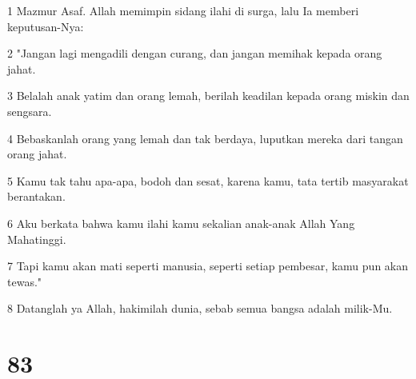 \par 1 Mazmur Asaf. Allah memimpin sidang ilahi di surga, lalu Ia memberi keputusan-Nya:
\par 2 "Jangan lagi mengadili dengan curang, dan jangan memihak kepada orang jahat.
\par 3 Belalah anak yatim dan orang lemah, berilah keadilan kepada orang miskin dan sengsara.
\par 4 Bebaskanlah orang yang lemah dan tak berdaya, luputkan mereka dari tangan orang jahat.
\par 5 Kamu tak tahu apa-apa, bodoh dan sesat, karena kamu, tata tertib masyarakat berantakan.
\par 6 Aku berkata bahwa kamu ilahi kamu sekalian anak-anak Allah Yang Mahatinggi.
\par 7 Tapi kamu akan mati seperti manusia, seperti setiap pembesar, kamu pun akan tewas."
\par 8 Datanglah ya Allah, hakimilah dunia, sebab semua bangsa adalah milik-Mu.

\chapter{83}

